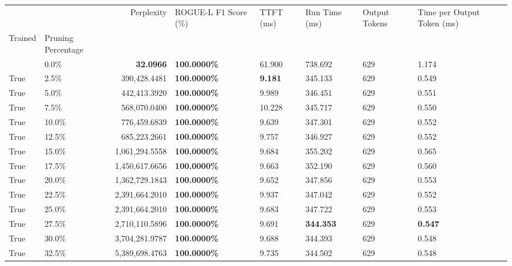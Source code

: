 \begin{table}[H]
\label{tab:evaluation-pipeline-1-trained}
\begin{tabular}{|m{}| m{}| r | R{0.13\textwidth}| R{0.09\textwidth}| R{0.09\textwidth}| R{0.09\textwidth}| R{0.11\textwidth}|}
\toprule
 &  & Perplexity & ROGUE-L F1 Score (\%) & TTFT (ms) & Run Time (ms) & Output Tokens & Time per Output Token (ms) \\
Trained & Pruning Percentage &  &  &  &  &  &  \\
\midrule
 & 0.0\% & \bfseries 32.0966 & \bfseries 100.0000\% & 61.900 & 738.692 & 629 & 1.174 \\
True & 2.5\% & 390,428.4481 & \bfseries \color{red} 100.0000\% & \bfseries \color{red} 9.181 & 345.133 & 629 & 0.549 \\
True & 5.0\% & 442,413.3920 & \bfseries \color{red} 100.0000\% & 9.989 & 346.451 & 629 & 0.551 \\
True & 7.5\% & 568,070.0400 & \bfseries \color{red} 100.0000\% & 10.228 & 345.717 & 629 & 0.550 \\
True & 10.0\% & 776,459.6839 & \bfseries \color{red} 100.0000\% & 9.639 & 347.301 & 629 & 0.552 \\
True & 12.5\% & 685,223.2661 & \bfseries \color{red} 100.0000\% & 9.757 & 346.927 & 629 & 0.552 \\
True & 15.0\% & 1,061,294.5558 & \bfseries \color{red} 100.0000\% & 9.684 & 355.202 & 629 & 0.565 \\
True & 17.5\% & 1,450,617.6656 & \bfseries \color{red} 100.0000\% & 9.663 & 352.190 & 629 & 0.560 \\
True & 20.0\% & 1,362,729.1843 & \bfseries \color{red} 100.0000\% & 9.652 & 347.856 & 629 & 0.553 \\
True & 22.5\% & 2,391,664.2010 & \bfseries \color{red} 100.0000\% & 9.937 & 347.042 & 629 & 0.552 \\
True & 25.0\% & 2,391,664.2010 & \bfseries \color{red} 100.0000\% & 9.683 & 347.722 & 629 & 0.553 \\
True & 27.5\% & 2,710,110.5896 & \bfseries \color{red} 100.0000\% & 9.691 & \bfseries \color{red} 344.353 & 629 & \bfseries \color{red} 0.547 \\
True & 30.0\% & 3,704,281.9787 & \bfseries \color{red} 100.0000\% & 9.688 & 344.393 & 629 & 0.548 \\
True & 32.5\% & 5,389,698.4763 & \bfseries \color{red} 100.0000\% & 9.735 & 344.502 & 629 & 0.548 \\

\end{tabular}
\end{table}
